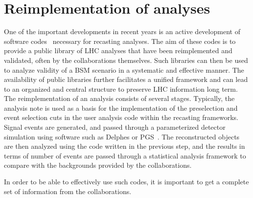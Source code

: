 \section{Reimplementation of analyses}

One of the important developments in recent years is an active development of software codes~\cite{Dumont:2014tja, Conte:2014zja, Kim:2015wza,Cranmer:2010hk,ATOM,Barducci:2014ila} necessary for recasting analyses. The aim of these codes is to provide a public library of LHC analyses that have been reimplemented and validated, often by the collaborations themselves. Such libraries can then be used to analyze validity of a BSM scenario in a systematic and effective manner. The availability of public libraries further facilitates a unified framework and can lead to an organized and central structure to preserve LHC information long term.
The reimplementation of an analysis consists of several stages. Typically, the analysis note is used as a basis for the implementation of the preselection and event selection cuts in the user analysis code within the recasting frameworks. Signal events are generated, and passed through a parameterized detector simulation using software such as Delphes or PGS~\cite{deFavereau:2013fsa,PGS}. The reconstructed objects are then analyzed using the code written in the previous step, and the results in terms of number of events are passed through a statistical analysis framework to compare with the backgrounds provided by the collaborations. 

In order to be able to effectively use such codes, it is important to get a complete set of information from the collaborations. 

